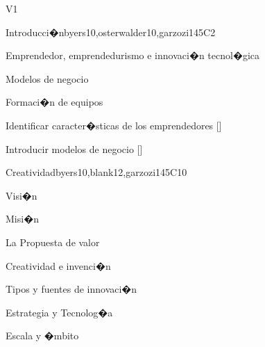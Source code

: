 \begin{syllabus}
\begin{competences}{V1}
\end{competences}



\begin{unit}{}{Introducci�n}{byers10,osterwalder10,garzozi14}{5}{C2}
\begin{topics}
      \item Emprendedor, emprendedurismo e innovaci�n tecnol�gica
      \item Modelos de negocio
      \item Formaci�n de equipos
   \end{topics}

    \begin{learningoutcomes} 
      \item Identificar caracter�sticas de los emprendedores  [\Familiarity]
      \item Introducir modelos de negocio  [\Familiarity]
    \end{learningoutcomes} 
\end{unit}

\begin{unit}{}{Creatividad}{byers10,blank12,garzozi14}{5}{C10}
\begin{topics}
      \item Visi�n
      \item Misi�n
      \item La Propuesta de valor
      \item Creatividad e invenci�n
      \item Tipos y fuentes de innovaci�n
      \item Estrategia y Tecnolog�a
      \item Escala y �mbito
   \end{topics}


\end{unit}
\end{syllabus}
